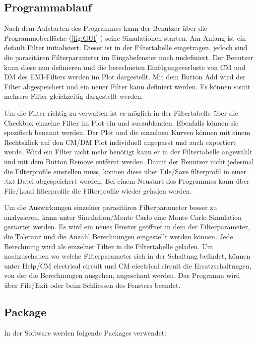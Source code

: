 \newpage

\subsection{Programmablauf} \label{subsec:programmablauf}


Nach dem Aufstarten des Programmes kann der Benutzer über die Programmoberfläche (\ref{fig:GUI} ) seine Simulationen starten.
Am Anfang ist ein default Filter initialisiert. Dieser ist in der Filtertabelle eingetragen, jedoch sind die parasitären Filterparameter im Eingabefenster noch undefiniert. Der Benutzer kann diese nun definieren und die berechneten Einfügungsverluste von CM und DM des EMI-Filters werden im Plot dargestellt. Mit dem Button Add wird der Filter abgespeichert und ein neuer Filter kann definiert werden. Es können somit mehrere Filter gleichzeitig dargestellt werden. 

Um die Filter richtig zu verwalten ist es möglich in der Filtertabelle über die Checkbox einzelne Filter im Plot ein und auszublenden. Ebenfalls können sie spezifisch benannt werden. Der Plot und die einzelnen Kurven können mit einem Rechtsklick auf den CM/DM Plot individuell angepasst und auch exportiert werde. Wird ein Filter nicht mehr benötigt kann er in der Filtertabelle angewählt und mit dem Button Remove entfernt werden. Damit der Benutzer nicht jedesmal die Filterprofile einstellen muss, können diese über File/Save filterprofil in einer .txt Datei abgespeichert werden. Bei einem Neustart des Programmes kann über File/Load filterprofile die Filterprofile wieder geladen werden. 

Um die Auswirkungen einzelner parasitären Filterparameter besser zu analysieren, kann unter Simulation/Monte Carlo eine Monte Carlo Simulation gestartet werden. Es wird ein neues Fenster geöffnet in dem der Filterparameter, die Toleranz und die Anzahl Berechnungen eingestellt werden können. Jede Berechnung wird als einzelner Filter in die Filtertabelle geladen. Um nachzuschauen wo welche Filterparameter sich in der Schaltung befindet, können unter Help/CM electrical circuit und CM electrical circuit die Ersatzschaltungen, von der die Berechnungen ausgehen, angeschaut werden. Das Programm wird über File/Exit oder beim Schliessen des Fensters beendet.
 

\subsection{Package} \label{subsec:package}

In der Software werden folgende Packages verwendet:



\newpage
